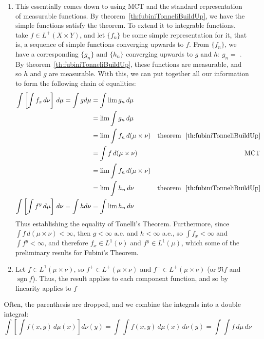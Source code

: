 \documentclass[oneside]{book}
\newcommand{\sgn}{\operatorname{sgn}}
\begin{document}
\begin{Proof}
	\begin{enumerate}
		\item This essentially comes down to using MCT and the standard representation of measurable functions. By
			theorem~\ref{th:fubiniTonneliBuildUp}, we have the simple functions satisfy the theorem. To extend it to
			integrable functions, take $f \in L^+(X\times Y)$, and let $\{f_n\}$ be some simple representation for it,
			that is, a sequence of simple functions converging upwards to $f$. From $\{f_n\}$, we have a corresponding
			$\{g_n\}$ and $\{h_n\}$ converging upwards to $g$ and $h$: $g_n =$ . By theorem~\ref{th:fubiniTonneliBuildUp},
			these functions are measurable, and so $h$ and $g$ are measurable. With this, we can put together all our
			information to form the following chain of equalities:
			\begin{align*}
				\int \left[\int f_x\,d\nu\right]\,d\mu =\int gd\mu &= \int \lim g_n\,d\mu\\
						   &= \lim\int g_n\,d\mu\\
						   &= \lim \int f_n\, d(\mu\times \nu) & \text{theorem ~\ref{th:fubiniTonneliBuildUp}}\\
						   &= \int f\,d(\mu\times\nu) & \text{MCT}\\
						   &= \lim \int f_n\, d(\mu\times \nu)\\
						   &= \lim\int h_n\,d\nu & \text{theorem ~\ref{th:fubiniTonneliBuildUp}}\\
				\int \left[\int f^y\,d\mu\right]\,d\nu =\int hd\nu &= \int \lim h_n\,d\nu 
			\end{align*}
			Thus establishing the equality of Tonelli's Theorem. Furthermore, since $\int f\,d(\mu\times \nu) <\infty$,
			then $g < \infty$ a.e. and $h < \infty$ a.e., so $\int f_x < \infty$ and $\int f^y < \infty$, and therefore
			$f_x \in L^1(\nu)$ and $f^y \in L^1(\mu)$, which some of the preliminary results for Fubini's Theorem.
		\item Let $f \in L^1(\mu\times \nu)$, so $f^+ \in L^+(\mu\times \nu)$ and $f^- \in L^+(\mu\times \nu)$ (or $\Re
			f$ and $\sgn f$). Thus, the result applies to each component function, and so by linearity applies to $f$
	\end{enumerate}
\end{Proof}

Often, the parenthesis are dropped, and we combine the integrals into a double integral:
\[
	\int \left[\int f(x,y)\,d\mu(x)\right]d\nu(y) = \int\int f(x,y)\,d\mu(x)\,d\nu(y) = \int\int f\, d\mu\,d\nu
\]
\end{document}
